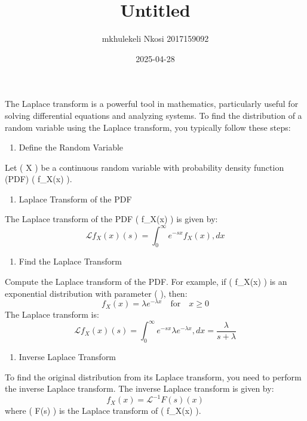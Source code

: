 \documentclass[
]{article}
\title{Untitled}
\author{mkhulekeli Nkosi 2017159092}
\date{2025-04-28}
\providecommand{\tightlist}{%
  \setlength{\itemsep}{0pt}\setlength{\parskip}{0pt}}
\begin{document}
\maketitle

The Laplace transform is a powerful tool in mathematics, particularly
useful for solving differential equations and analyzing systems. To find
the distribution of a random variable using the Laplace transform, you
typically follow these steps:

\begin{enumerate}
\def\labelenumi{\arabic{enumi}.}
\tightlist
\item
  Define the Random Variable
\end{enumerate}

Let ( X ) be a continuous random variable with probability density
function (PDF) ( f\_X(x) ).

\begin{enumerate}
\def\labelenumi{\arabic{enumi}.}
\setcounter{enumi}{1}
\tightlist
\item
  Laplace Transform of the PDF
\end{enumerate}

The Laplace transform of the PDF ( f\_X(x) ) is given by:
\[ \mathcal{L}{f_X(x)}(s) = \int_{0}^{\infty} e^{-sx} f_X(x) , dx \]

\begin{enumerate}
\def\labelenumi{\arabic{enumi}.}
\setcounter{enumi}{2}
\tightlist
\item
  Find the Laplace Transform
\end{enumerate}

Compute the Laplace transform of the PDF. For example, if ( f\_X(x) ) is
an exponential distribution with parameter ( \lambda ), then:
\[ f_X(x) = \lambda e^{-\lambda x} \quad \text{for} \quad x \geq 0 \]
The Laplace transform is:
\[ \mathcal{L}{f_X(x)}(s) = \int_{0}^{\infty} e^{-sx} \lambda e^{-\lambda x} , dx = \frac{\lambda}{s + \lambda} \]

\begin{enumerate}
\def\labelenumi{\arabic{enumi}.}
\setcounter{enumi}{3}
\tightlist
\item
  Inverse Laplace Transform
\end{enumerate}

To find the original distribution from its Laplace transform, you need
to perform the inverse Laplace transform. The inverse Laplace transform
is given by: \[ f_X(x) = \mathcal{L}^{-1}{F(s)}(x) \] where ( F(s) ) is
the Laplace transform of ( f\_X(x) ).
\end{document}
